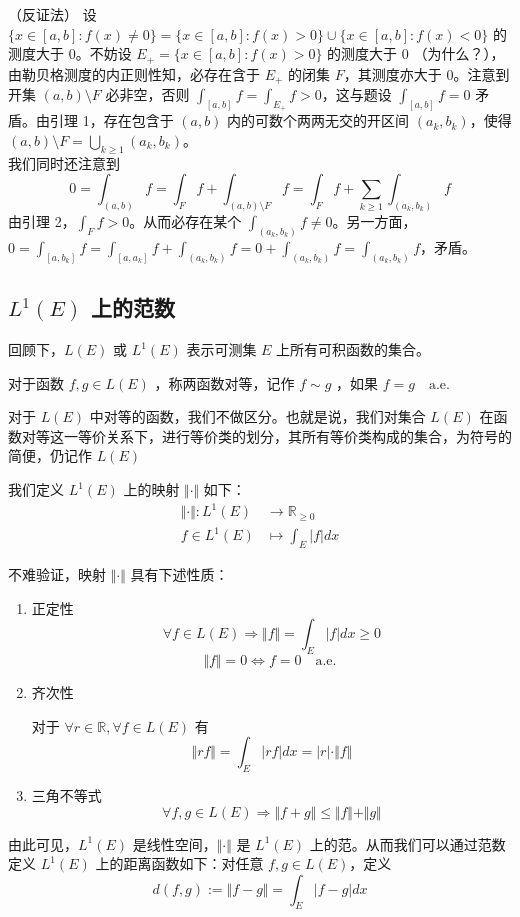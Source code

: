 \documentclass{ctexbook}
\newcommand{\no}{\noindent}
\newcommand{\pro}{\no{\bf 证明：}}
\newcommand{\R}{\mathbb{R}}
\newcommand{\nae}{\mathrm{\quad a.e.\; }}
\newcommand{\ITEMS}{\begin{enumerate}[leftmargin=4em]}
\newcommand{\ITEME}{\end{enumerate}}
\begin{document}
\pro （反证法）
设 $\{x\in [a,b]: f(x)\ne 0\}=\{x\in [a,b]: f(x)> 0\}\cup \{x\in [a,b]: f(x)< 0\}$ 的测度大于 $0$。不妨设 $E_+=\{x\in [a,b]: f(x)> 0\}$ 的测度大于 $0$ （为什么？），由勒贝格测度的内正则性知，必存在含于 $E_+$ 的闭集 $F$，其测度亦大于 $0$。注意到开集 $(a,b)\setminus F$ 必非空，否则 $\int_{[a,b]}f =\int_{E_+}f >0$，这与题设 $\int_{[a,b]}f =0$
矛盾。由引理 1，存在包含于 $(a,b)$ 内的可数个两两无交的开区间 $(a_k,b_k)$，使得 $(a,b)\setminus F=\bigcup_{k\ge1}(a_k,b_k)$。\\
我们同时还注意到 
$$0=\int_{(a,b)}f=\int_{F}f+\int_{(a,b)\setminus F}f=\int_{F}f+\sum\limits_{k \ge 1}\int_{(a_k,b_k)}f$$
由引理 2，$\int_{F}f>0$。从而必存在某个 $\int_{(a_k,b_k)}f\ne 0$。另一方面，$0=\int_{[a,b_k]}f=\int_{[a,a_k]}f +\int_{(a_k,b_k)}f=0+\int_{(a_k,b_k)}f=\int_{(a_k,b_k)}f$，矛盾。


\subsection{$L^1(E)$ 上的范数}

回顾下，$L(E)$ 或 $L^1(E)$ 表示可测集 $E$ 上所有可积函数的集合。

对于函数 $f,g\in L(E)$ ，称两函数对等，记作 $f\sim g$ ，如果 $f = g \nae$

对于 $L(E)$ 中对等的函数，我们不做区分。也就是说，我们对集合 $L(E)$ 在函数对等这一等价关系下，进行等价类的划分，其所有等价类构成的集合，为符号的简便，仍记作 $L(E)$ 

我们定义 $L^1(E)$ 上的映射 $\Vert\cdot\Vert$ 如下：
\[
\begin{aligned}
	\Vert\cdot\Vert: L^1(E) &\to \R_{\ge0}\\
	f\in L^1(E) &\mapsto \int_E |f| dx
\end{aligned}
\]

不难验证，映射 $\Vert\cdot\Vert$ 具有下述性质：
\ITEMS
	\item 正定性
	\[
		\forall f\in L(E) \Rightarrow \Vert f \Vert = \int_E |f| dx \ge 0
	\]
	\[
		\Vert f \Vert = 0 \iff f = 0 \nae
	\]
	\item 齐次性
	
	对于 $\forall r \in \R, \forall f \in L(E)$ 有
	\[
		\Vert rf \Vert = \int_E |rf| dx = |r| \cdot \Vert f \Vert 
	\]
	\item 三角不等式
	\[
		\forall f,g\in L(E) \Rightarrow \Vert f + g\Vert \le \Vert f \Vert + \Vert g\Vert
	\]
\ITEME 
由此可见，$L^1(E)$ 是线性空间，$\Vert\cdot\Vert$ 是 $L^1(E)$ 上的范。从而我们可以通过范数定义 $L^1(E)$ 上的距离函数如下：对任意 $f,g \in L(E)$，定义
\[
d(f,g) := \Vert f - g \Vert = \int_E |f-g| dx
\]
\end{document}
